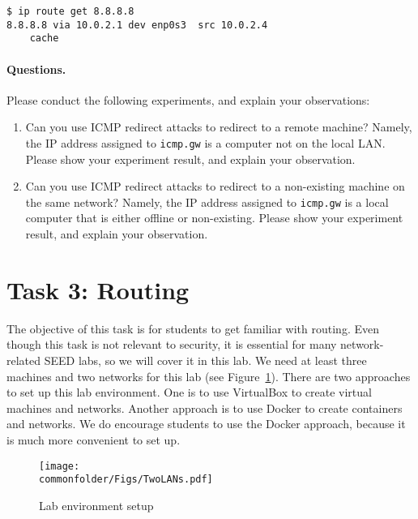 \begin{lstlisting}
$ ip route get 8.8.8.8
8.8.8.8 via 10.0.2.1 dev enp0s3  src 10.0.2.4
    cache
\end{lstlisting}


\paragraph{Questions.} Please conduct the following experiments, and explain your observations:

\begin{enumerate}
\item Can you use ICMP redirect attacks to redirect to a remote machine? Namely,
the IP address assigned to \texttt{icmp.gw} is a computer not on the local LAN. 
Please show your experiment result, and explain your observation.  

\item Can you use ICMP redirect attacks to redirect to a non-existing machine on
the same network? Namely, the IP address assigned to \texttt{icmp.gw} is a local computer that
is either offline or non-existing. 
Please show your experiment result, and explain your observation.  
\end{enumerate}





\section{Task 3: Routing} 


The objective of this task is for students to get familiar with routing. 
Even though this task is not relevant to security, it is essential
for many network-related SEED labs, so we will cover it
in this lab. 
We need at least three machines 
and two networks for this lab (see Figure~\ref{fig:setup}). 
There are two approaches to set up this lab environment. 
One is to use VirtualBox to create virtual machines and networks. 
Another approach is to use Docker to create containers and networks. 
We do encourage students to use 
the Docker approach, because it is much more convenient to set up.


\begin{figure}[htb]
\begin{center}
\texttt{[image: \\commonfolder/Figs/TwoLANs.pdf]}
\end{center}
\caption{Lab environment setup}
\label{fig:setup}
\end{figure}


